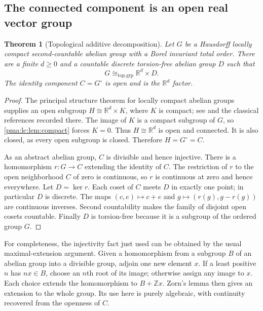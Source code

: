 \documentclass[11pt]{article}
\numberwithin{equation}{section}
\newtheorem{theorem}{Theorem}[section]
\theoremstyle{definition}
\theoremstyle{remark}
\newcommand{\Z}{\mathbb Z}
\newcommand{\R}{\mathbb R}
\begin{document}
\subsection{The connected component is an open real vector group}
\begin{theorem}[Topological additive decomposition]\label{pma:lc:thm:lca}
Let $G$ be a Hausdorff locally compact second-countable abelian group with
a Borel invariant total order. There are a finite $d\ge0$ and a countable
discrete torsion-free abelian group $D$ such that
\begin{equation}\label{pma:lc:eq:lcasplit}
 G\cong_{\mathrm{top.grp}}\R^d\times D.
\end{equation}
The identity component $C=G^\circ$ is open and is the $\R^d$ factor.
\end{theorem}
\begin{proof}
The principal structure theorem for locally compact abelian groups supplies
an open subgroup $H\cong\R^d\times K$, where $K$ is compact; see
\cite[p.~4]{Dobben} and the classical references recorded there.
The image of $K$ is a compact subgroup of $G$, so \cref{pma:lc:lem:compact}
forces $K=0$. Thus $H\cong\R^d$ is open and connected. It is also
closed, as every open subgroup is closed. Therefore $H=G^\circ=C$.

As an abstract abelian group, $C$ is divisible and hence injective.
There is a homomorphism $r:G\to C$ extending the identity of $C$.
The restriction of $r$ to the open neighborhood $C$ of zero is continuous,
so $r$ is continuous at zero and hence everywhere. Let $D=\ker r$.
Each coset of $C$ meets $D$ in exactly one point; in particular $D$ is
discrete. The maps $(c,e)\mapsto c+e$ and $g\mapsto(r(g),g-r(g))$
are continuous inverses. Second countability makes the family of disjoint
open cosets countable. Finally $D$ is torsion-free because it is a subgroup
of the ordered group $G$.
\end{proof}

For completeness, the injectivity fact just used can be obtained by the
usual maximal-extension argument. Given a homomorphism from a subgroup
$B$ of an abelian group into a divisible group, adjoin one new element
$x$. If a least positive $n$ has $nx\in B$, choose an $n$th root of its
image; otherwise assign any image to $x$. Each choice extends the
homomorphism to $B+\Z x$. Zorn's lemma then gives an extension to the
whole group. Its use here is purely algebraic, with continuity recovered
from the openness of $C$.
\end{document}
